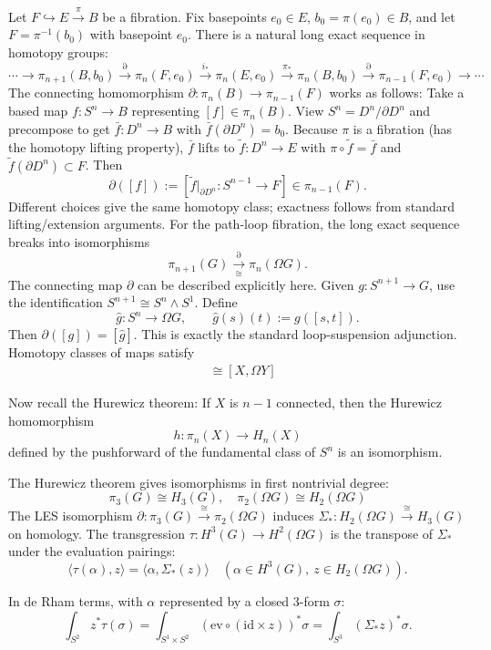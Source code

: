 \documentclass[12pt]{article}
\begin{document}
\begin{remark}
    Let $F \hookrightarrow E \xrightarrow{\pi} B$ be a fibration. Fix basepoints $e_0\in E$, $b_0=\pi(e_0)\in B$, and let $F=\pi^{-1}(b_0)$ with basepoint $e_0$. There is a natural long exact sequence in homotopy groups:
    \[
        \cdots \longrightarrow \pi_{n+1}(B,b_0) \xrightarrow{\partial} \pi_{n}(F,e_0) \xrightarrow{i_*} \pi_{n}(E,e_0) \xrightarrow{\pi_*} \pi_{n}(B,b_0) \xrightarrow{\partial} \pi_{n-1}(F,e_0) \longrightarrow \cdots
    \]
    The connecting homomorphism $\partial:\pi_n(B)\to \pi_{n-1}(F)$ works as follows: Take a based map $f:S^n\to B$ representing $[f]\in\pi_n(B)$. View $S^n=D^n/\partial D^n$ and precompose to get $\bar{f}:D^n\to B$ with $\bar{f}(\partial D^n)=b_0$. Because $\pi$ is a fibration (has the homotopy lifting property), $\bar{f}$ lifts to $\tilde{f}:D^n\to E$ with $\pi\circ \tilde{f}=\bar{f}$ and $\tilde{f}(\partial D^n)\subset F$. Then
    \[
        \partial([f]) := \left[\tilde{f}|_{\partial D^n} : S^{n-1}\to F\right] \in \pi_{n-1}(F).
    \]
    Different choices give the same homotopy class; exactness follows from standard lifting/extension arguments. For the path-loop fibration, the long exact sequence breaks into isomorphisms
    \[
        \pi_{n+1}(G) \xrightarrow[\cong]{\partial} \pi_n(\Omega G).
    \]
    The connecting map $\partial$ can be described explicitly here. Given $g:S^{n+1}\to G$, use the identification $S^{n+1}\cong S^n\wedge S^1$. Define
    \[
        \widehat{g}:S^n\longrightarrow \Omega G, \qquad \widehat{g}(s)(t) := g([s,t]).
    \]
    Then $\partial([g])=[\widehat{g}]$. This is exactly the standard loop-suspension adjunction. Homotopy classes of maps satisfy
    \begin{align*}
        [\Sigma X, Y] & \cong [X, \Omega Y]
    \end{align*}

    Now recall the Hurewicz theorem: If $X$ is $n-1$ connected, then the Hurewicz homomorphism
    \[
        h: \pi_n(X) \to H_n(X)
    \]
    defined by the pushforward of the fundamental class of $S^n$ is an isomorphism.

    The Hurewicz theorem gives isomorphisms in first nontrivial degree: \[\pi_3(G)\cong H_3(G), \quad \pi_2(\Omega G)\cong H_2(\Omega G)\] The LES isomorphism $\partial:\pi_3(G)\xrightarrow{\cong}\pi_2(\Omega G)$ induces $\Sigma_*:H_2(\Omega G)\xrightarrow{\cong} H_3(G)$ on homology. The transgression $\tau:H^3(G)\to H^2(\Omega G)$ is the transpose of $\Sigma_*$ under the evaluation pairings:
    \[
        \langle \tau(\alpha), z\rangle = \langle \alpha, \Sigma_*(z)\rangle \quad (\alpha\in H^3(G),\ z\in H_2(\Omega G)).
    \]

    In de Rham terms, with $\alpha$ represented by a closed 3-form $\sigma$:
    \[
        \int_{S^2} z^*\tau(\sigma) = \int_{S^1\times S^2} (\mathrm{ev}\circ(\mathrm{id}\times z))^*\sigma = \int_{S^3} (\Sigma_* z)^*\sigma.
    \]
\end{remark}
\end{document}
